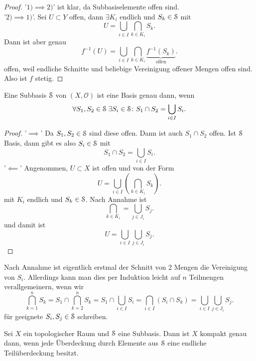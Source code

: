\begin{proof}
    '$1) \implies 2)$' ist klar, da Subbasiselemente offen sind. \\
    '$2) \implies 1)$'. Sei $U \subset Y$ offen, dann $\exists K_i$ endlich und $S_k \in \mathcal{S}$ mit
    \[
    U = \bigcup_{i \in  I} \bigcap_{k\in K_i} S_k
    .\] 
    Dann ist aber genau
    \[
        f^{-1}(U) = \bigcup_{i \in  I} \bigcap_{k\in K_i} \underbrace{f^{-1}(S_k)}_{\text{offen}} 
    .\] 
    offen, weil endliche Schnitte und beliebige Vereinigung offener Mengen offen sind. Also ist $f$ stetig.
\end{proof}

\begin{theorem}\label{thm:subbasis-ist-basis-wenn-schnitt-generiert-wird}
    Eine Subbasis $\mathcal{S}$ von  $(X, \mathcal{O})$ ist eine Basis genau dann, wenn
    \[
    \forall S_1, S_2 \in \mathcal{S} \;\exists S_i \in \mathcal{S} \colon S_1 \cap S_2 = \bigcup_{i \in I} S_i
    .\] 
\end{theorem}
\begin{proof}
'$\implies$'    Da $S_1,S_2 \in \mathcal{S}$ sind diese offen. Dann ist auch $S_1\cap S_2$ offen. Ist $\mathcal{S}$ Basis, dann gibt es also  $S_i \in  \mathcal{S}$ mit 
\[
S_1 \cap  S_2 = \bigcup_{i \in  I} S_i
.\] 
'$\impliedby$' Angenommen, $U\subset X$ ist offen und von der Form
\[
    U = \bigcup_{i \in  I} \left( \bigcap_{k\in K_i} S_k \right) 
.\] 
mit $K_i$ endlich und  $S_k \in  \mathcal{S}$. Nach Annahme ist
\[
\bigcap_{k\in K_i} = \bigcup_{j\in J_i} S_j  
.\] 
und damit ist
\[
U = \bigcup_{i\in I} \bigcup_{j\in J_i} S_j  
.\] 
\end{proof}
\begin{remark*}
    Nach Annahme ist eigentlich erstmal der Schnitt von 2 Mengen die Vereinigung von $S_i$. Allerdings kann man dies per Induktion leicht auf  $n$ Teilmengen verallgemeinern, wenn wir
     \[
         \bigcap_{k=1}^n S_k = S_1 \cap  \bigcap_{k=2}^{n} S_k = S_1 \cap \bigcup_{i\in I} S_i = \bigcap_{i\in I} (S_i \cap S_k) = \bigcup_{i\in I} \bigcup_{j\in J_i} S_j  
    .\]
    für geeignete $S_i, S_j\in \mathcal{S}$ schreiben.
\end{remark*}
\begin{theorem}\label{thm:alexander}
    Sei $X$ ein topologischer Raum und  $\mathcal{S}$ eine Subbasis. Dann ist  $X$ kompakt genau dann, wenn jede Überdeckung durch Elemente aus  $\mathcal{S}$ eine endliche Teilüberdeckung besitzt.
\end{theorem}
